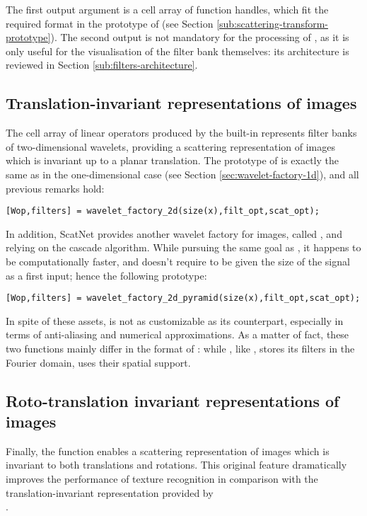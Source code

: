 \documentclass{article}
\begin{document}
The first output argument is a cell array of function handles, which fit the required format in the prototype of  (see Section \ref{sub:scattering-transform-prototype}). The second output is not mandatory for the processing of , as it is only useful for the visualisation of the filter bank themselves: its architecture is reviewed in Section \ref{sub:filters-architecture}.

\subsection{Translation-invariant representations of images \label{sub:wavelet-factory-2d}}

The cell array of linear operators produced by the  built-in represents filter banks of two-dimensional wavelets, providing a scattering representation of images which is invariant up to a planar translation. The prototype of  is exactly the same as in the one-dimensional case (see Section \ref{sec:wavelet-factory-1d}), and all previous remarks hold: 

\begin{lstlisting}
[Wop,filters] = wavelet_factory_2d(size(x),filt_opt,scat_opt);
\end{lstlisting}

In addition, ScatNet provides another wavelet factory for images, called , and relying on the cascade algorithm.  While pursuing the same goal as , it happens to be computationally faster, and doesn't require to be given the size of the signal  as a first input; hence the following prototype:

\begin{lstlisting}
[Wop,filters] = wavelet_factory_2d_pyramid(size(x),filt_opt,scat_opt);
\end{lstlisting}

In spite of these assets,  is not as customizable as its counterpart, especially in terms of anti-aliasing and numerical approximations. As a matter of fact, these two functions mainly differ in the format of  : while , like , stores its filters in the Fourier domain,  uses their spatial support.

\subsection{Roto-translation invariant representations of images}
Finally, the function  enables a scattering representation of images which is invariant to both translations and rotations. This original feature dramatically improves the performance of texture recognition in comparison with the translation-invariant representation provided by \\
. 
\end{document}

